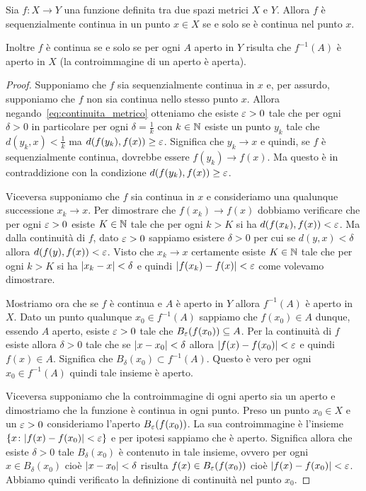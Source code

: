 \begin{theorem}
Sia $f\colon X \to Y$ una funzione definita tra due spazi metrici $X$ e $Y$.
Allora $f$ è sequenzialmente continua in un punto $x\in X$ se e solo se è
continua nel punto $x$.

Inoltre $f$ è continua se e solo se
per ogni $A$ aperto in $Y$ risulta che $f^{-1}(A)$ è aperto in $X$
(la controimmagine di un aperto è aperta).
\end{theorem}
%
\begin{proof}
Supponiamo che $f$ sia sequenzialmente continua in $x$
e, per assurdo, supponiamo che $f$ non sia continua nello stesso punto $x$.
Allora negando~\eqref{eq:continuita_metrico} otteniamo che esiste $\varepsilon>0$
tale che per ogni $\delta>0$ in particolare per ogni $\delta = \frac{1}{k}$
con $k\in {\mathbb N}$ esiste un punto $y_k$ tale che $d(y_k,x)<\frac 1 k$ ma
$d(f(y_k),f(x))\ge \varepsilon$. Significa che $y_k \to x$ e quindi,
se $f$ è sequenzialmente continua, dovrebbe essere $f(y_k)\to f(x)$. Ma
questo è in contraddizione con la condizione $d(f(y_k),f(x))\ge \varepsilon$.

Viceversa supponiamo che $f$ sia continua in $x$ e consideriamo una qualunque
successione $x_k \to x$.
Per dimostrare che $f(x_k)\to f(x)$ dobbiamo verificare che per ogni
$\varepsilon>0$ esiste $K\in {\mathbb N}$ tale che per ogni $k>K$ si ha $d(f(x_k),f(x)) < \varepsilon$.
Ma dalla continuità di $f$, dato $\varepsilon>0$ sappiamo esistere $\delta>0$ per cui
se $d(y,x)<\delta$ allora $d(f(y),f(x))<\varepsilon$. Visto che $x_k\to x$
certamente esiste $K\in {\mathbb N}$ tale che per ogni $k>K$ si ha ${\left|x_k-x\right|}<\delta$
e quindi ${\left|f(x_k)-f(x)\right|}< \varepsilon$ come volevamo dimostrare.

Mostriamo ora che se $f$ è continua e $A$ è aperto in $Y$ allora $f^{-1}(A)$
è aperto in $X$.
Dato un punto qualunque $x_0\in f^{-1}(A)$ sappiamo che $f(x_0)\in A$ dunque, essendo
$A$ aperto, esiste $\varepsilon>0$ tale che $B_\varepsilon(f(x_0))\subseteq A$.
Per la continuità di $f$ esiste allora $\delta>0$ tale che se ${\left|x-x_0\right|} < \delta$
allora ${\left|f(x)-f(x_0)\right|}<\varepsilon$ e quindi $f(x)\in A$. Significa che $B_\delta(x_0)\subset f^{-1}(A)$.
Questo è vero per ogni $x_0\in f^{-1}(A)$ quindi tale insieme è aperto.

Viceversa supponiamo che la controimmagine di ogni aperto sia un aperto e
dimostriamo che la funzione è continua in ogni punto.
Preso un punto $x_0\in X$ e un $\varepsilon>0$ consideriamo l'aperto $B_\varepsilon(f(x_0))$.
La sua controimmagine è l'insieme ${\left\{ x\colon {\left|f(x)-f(x_0)\right|} < \varepsilon \right\}}$ e
per ipotesi sappiamo che è aperto. Significa allora che esiste $\delta>0$
tale $B_\delta(x_0)$ è contenuto in tale insieme, ovvero per ogni $x\in B_\delta(x_0)$
cioè ${\left|x-x_0\right|}<\delta$
risulta $f(x) \in B_\varepsilon(f(x_0))$
cioè ${\left|f(x)-f(x_0)\right|}<\varepsilon$.
Abbiamo quindi verificato la definizione di
continuità nel punto $x_0$.
\end{proof}


